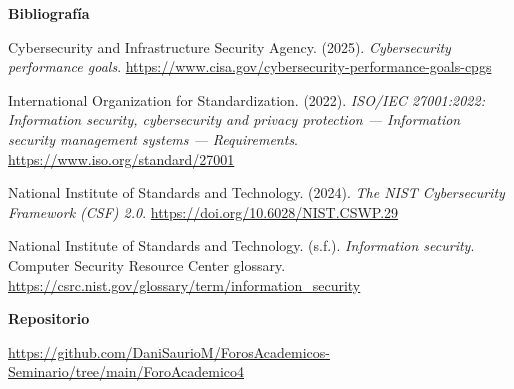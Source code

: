 \documentclass[12pt,letterpaper]{article}
\begin{document}
\textbf{Bibliografía}

Cybersecurity and Infrastructure Security Agency. (2025). \textit{Cybersecurity performance goals}. \url{https://www.cisa.gov/cybersecurity-performance-goals-cpgs}

International Organization for Standardization. (2022). \textit{ISO/IEC 27001:2022: Information security, cybersecurity and privacy protection --- Information security management systems --- Requirements}. \url{https://www.iso.org/standard/27001}

National Institute of Standards and Technology. (2024). \textit{The NIST Cybersecurity Framework (CSF) 2.0}. \url{https://doi.org/10.6028/NIST.CSWP.29}

National Institute of Standards and Technology. (s.f.). \textit{Information security}. Computer Security Resource Center glossary. \url{https://csrc.nist.gov/glossary/term/information_security}

\textbf{Repositorio}

\noindent\url{https://github.com/DaniSaurioM/ForosAcademicos-Seminario/tree/main/ForoAcademico4}
\end{document}
